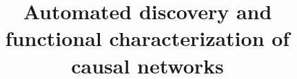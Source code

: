 \documentclass{llncs}
\title{Automated discovery and functional characterization of causal networks} %
\author{}
\begin{document}
\maketitle





\begin{thebibliography}{} %

\end{thebibliography}
\end{document}
